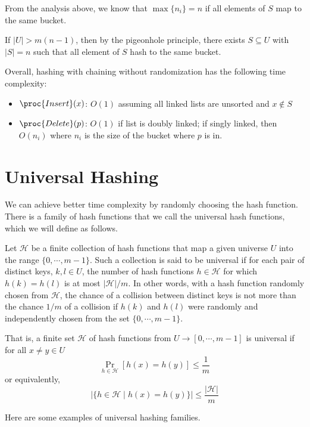 From the analysis above, we know that $\max\{n_i\} = n$ if all elements of $S$ map to the same bucket.

If $|U| > m(n-1)$, then by the pigeonhole principle, there exists $S \subseteq U$ with $|S|=n$ such that all element of $S$ hash to the same bucket.

Overall, hashing with chaining without randomization has the following time complexity:
\begin{itemize}
    \item $\proc{Insert}(x)$: $O(1)$ assuming all linked lists are unsorted and $x \not\in S$
    \item $\proc{Delete}(p)$: $O(1)$ if list is doubly linked; if singly linked, then $O(n_i)$ where $n_i$ is the size of the bucket where $p$ is in.
\end{itemize}

\section{Universal Hashing}

We can achieve better time complexity by randomly choosing the hash function. There is a family of hash functions that we call the universal hash functions, which we will define as follows.

\begin{definition} 
    Let $\mathcal{H}$ be a finite collection of hash functions that map a given universe $U$ into the range $\{0,\cdots,m-1\}$. Such a collection is said to be universal if for each pair of distinct keys, $k,l \in U$, the number of hash functions $h \in \mathcal{H}$ for which $h(k) = h(l)$ is at most $|\mathcal{H}|/m$. In other words, with a hash function randomly chosen from $\mathcal{H}$, the chance of a collision between distinct keys is not more than the chance $1/m$ of a collision if $h(k)$ and $h(l)$ were randomly and independently chosen from the set $\{0,\cdots,m-1\}$.

    That is, a finite set $\mathcal{H}$ of hash functions from $U \to [0,\cdots,m-1]$ is universal if for all $x \neq y \in U$
    $$
    \Pr_{h \in \mathcal{H}} [h(x) = h(y)] \leq \frac{1}{m}
    $$
    or equivalently,
    $$
    \left| \{ h \in \mathcal{H} \mid h(x) = h(y) \} \right| \leq \frac{|\mathcal{H}|}{m}
    $$
\end{definition}

Here are some examples of universal hashing families.

